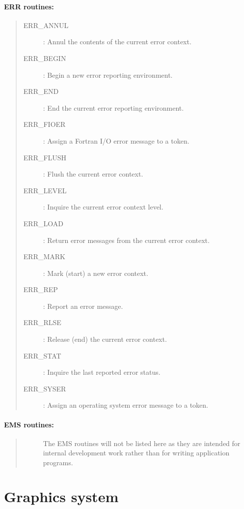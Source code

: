 \paragraph{ERR routines:}

\begin{quote}
\begin{description}
\item [ERR\_ANNUL] : Annul the contents of the current error context.
\item [ERR\_BEGIN] : Begin a new error reporting environment.
\item [ERR\_END] : End the current error reporting environment.
\item [ERR\_FIOER] : Assign a Fortran I/O error message to a token.
\item [ERR\_FLUSH] : Flush the current error context.
\item [ERR\_LEVEL] : Inquire the current error context level.
\item [ERR\_LOAD] : Return error messages from the current error context.
\item [ERR\_MARK] : Mark (start) a new error context.
\item [ERR\_REP] : Report an error message.
\item [ERR\_RLSE] : Release (end) the current error context.
\item [ERR\_STAT] : Inquire the last reported error status.
\item [ERR\_SYSER] : Assign an operating system error message to a token.
\end{description}
\end{quote}

\vspace*{10mm}

\paragraph{EMS routines:}\hfill

\begin{quote}
\begin{description}
\item [] The EMS routines will not be listed here as they are intended for
internal development work rather than for writing application programs.
\end{description}
\end{quote}

\newpage

\section{Graphics system}

